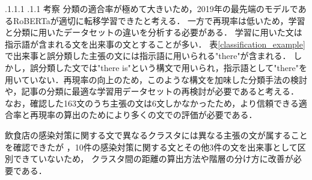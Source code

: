 \documentclass[a4paper, twocolumn, 10pt]{jarticle}
\makeatletter
\def\section{%
	\@startsection{section}{1}{\z@}%
	{.1\Cvs \@plus.1\Cdp \@minus.1\Cdp}%
	{.1\Cvs \@plus.1\Cdp}%
	{\normalfont\normalsize\bfseries}%
}
\makeatother
\begin{document}













\vspace{-3.0mm}
\section{考察}
分類の適合率が極めて大きいため，2019年の最先端のモデルであるRoBERTaが適切に転移学習できたと考える．
一方で再現率は低いため，学習と分類に用いたデータセットの違いを分析する必要がある．
学習に用いた文は指示語が含まれる文を出来事の文とすることが多い．
表\ref{classification_example}で出来事と誤分類した主張の文には指示語に用いられる"there"が含まれる．
しかし，誤分類した文では"there is"という構文で用いられ，指示語として"there"を用いていない．再現率の向上のため，このような構文を加味した分類手法の検討や，記事の分類に最適な学習用データセットの再検討が必要であると考える．
なお，確認した163文のうち主張の文は6文しかなかったため，より信頼できる適合率と再現率の算出のためにより多くの文での評価が必要である．

飲食店の感染対策に関する文で異なるクラスタには異なる主張の文が属することを確認できたが
，10件の感染対策に関する文とその他3件の文を出来事として区別できていないため，
クラスタ間の距離の算出方法や階層の分け方に改善が必要である．
\end{document}
